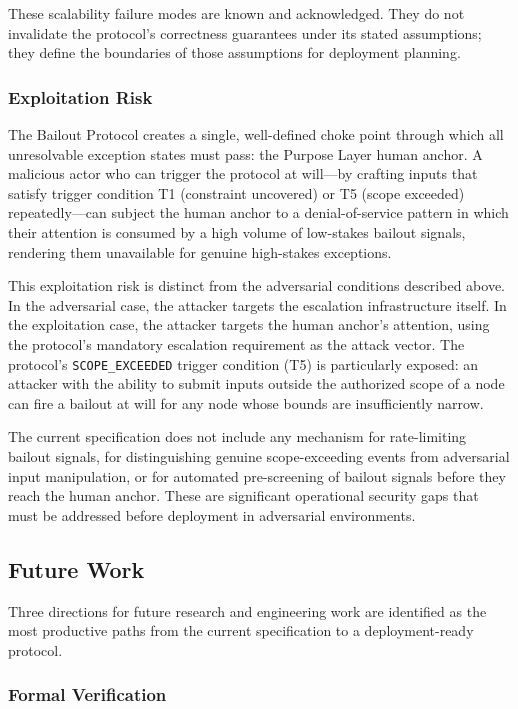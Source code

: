 \documentclass[12pt]{article}
\begin{document}
These scalability failure modes are known and acknowledged. They do not invalidate the protocol's correctness guarantees under its stated assumptions; they define the boundaries of those assumptions for deployment planning.

\subsubsection{Exploitation Risk}\label{sec:exploitation-risk}

The Bailout Protocol creates a single, well-defined choke point through which all unresolvable exception states must pass: the Purpose Layer human anchor. A malicious actor who can trigger the protocol at will---by crafting inputs that satisfy trigger condition T1 (constraint uncovered) or T5 (scope exceeded) repeatedly---can subject the human anchor to a denial-of-service pattern in which their attention is consumed by a high volume of low-stakes bailout signals, rendering them unavailable for genuine high-stakes exceptions.

This exploitation risk is distinct from the adversarial conditions described above. In the adversarial case, the attacker targets the escalation infrastructure itself. In the exploitation case, the attacker targets the human anchor's attention, using the protocol's mandatory escalation requirement as the attack vector. The protocol's \texttt{SCOPE\_EXCEEDED} trigger condition (T5) is particularly exposed: an attacker with the ability to submit inputs outside the authorized scope of a node can fire a bailout at will for any node whose bounds are insufficiently narrow.

The current specification does not include any mechanism for rate-limiting bailout signals, for distinguishing genuine scope-exceeding events from adversarial input manipulation, or for automated pre-screening of bailout signals before they reach the human anchor. These are significant operational security gaps that must be addressed before deployment in adversarial environments.

\subsection{Future Work}\label{sec:future-work}

Three directions for future research and engineering work are identified as the most productive paths from the current specification to a deployment-ready protocol.

\subsubsection{Formal Verification}\label{sec:formal-verification}
\end{document}
